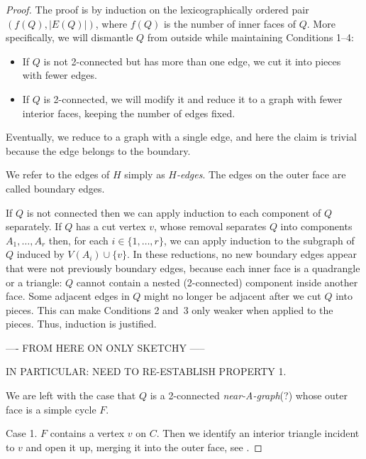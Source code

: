 \begin{proof}
The proof is by induction
   on the lexicographically ordered pair $(f(Q),|E(Q)|)$, where $f(Q)$
is the number of inner faces of $Q$. 
More specifically, %
we will dismantle $Q$
 from outside while maintaining
 Conditions 1--4:
\begin{itemize}
\item If $Q$ is not 2-connected but has more than one edge, we cut it
  into pieces with fewer edges.
\item If $Q$ is 2-connected, we will modify it and reduce it to a
  graph
with fewer interior faces,
keeping the number of edges fixed.
\end{itemize}
Eventually, we reduce to a graph with a single edge, and here the
claim is trivial because the edge belongs to the boundary.

   We refer to the edges of $H$ simply as \emph{$H$-edges}.
The edges on the outer
   face are called boundary edges.

If $Q$ is not connected then we can apply induction to each component
   of $Q$ separately. If $Q$ has a cut vertex $v$, whose removal
   separates $Q$ into components $A_1,\ldots,A_r$ then, for each
   $i\in\{1,\ldots,r\}$, we can apply induction to the subgraph of $Q$
   induced by $V(A_i)\cup\{v\}$.  
In these reductions, no new boundary edges appear that were not
previously boundary edges, because each inner face is
a quadrangle or a triangle: $Q$ cannot contain a nested (2-connected) component
inside another face.
Some adjacent edges in $Q$ might no longer be adjacent
after we cut $Q$ into pieces. This can make Conditions 2 and~3 only weaker
when applied to the pieces. Thus, induction is justified.

----  FROM HERE ON ONLY SKETCHY -----

IN PARTICULAR: NEED TO RE-ESTABLISH PROPERTY 1.

We are left with the case that $Q$ is a 2-connected \emph{near-A-graph}(?) whose outer face 
   is a simple cycle $F$.

Case 1. $F$ contains a vertex $v$ on $C$.
Then we identify an interior triangle incident to $v$ and open it up,
merging it into the outer face, see .


\end{proof}
